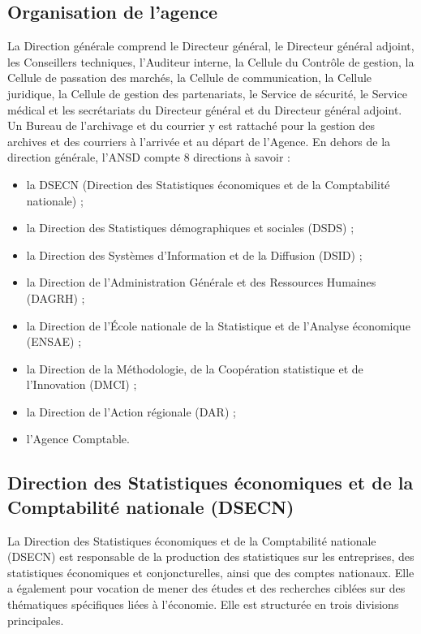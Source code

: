 \documentclass[12pt,a4paper]{report}
\begin{document}
\subsection{Organisation de l'agence}
La Direction générale comprend le Directeur général, le Directeur général adjoint, les Conseillers techniques, l'Auditeur interne, la Cellule du Contrôle de gestion, la Cellule de passation des marchés, la Cellule de communication, la Cellule juridique, la Cellule de gestion des partenariats, le Service de sécurité, le Service médical et les secrétariats du Directeur général et du Directeur général adjoint. Un Bureau de l'archivage et du courrier y est rattaché pour la gestion des archives et des courriers à l'arrivée et au départ de l'Agence. En dehors de la direction générale, l'ANSD compte 8 directions à savoir :
\begin{itemize}[nosep]
\item la DSECN (Direction des Statistiques économiques et de la Comptabilité nationale) ;
\item la Direction des Statistiques démographiques et sociales (DSDS) ;
\item la Direction des Systèmes d'Information et de la Diffusion (DSID) ;
\item la Direction de l'Administration Générale et des Ressources Humaines (DAGRH) ;
\item la Direction de l’École nationale de la Statistique et de l’Analyse économique (ENSAE) ;
\item la Direction de la Méthodologie, de la Coopération statistique et de l'Innovation (DMCI) ;
\item la Direction de l’Action régionale (DAR) ;
\item l'Agence Comptable.
\end{itemize}

\subsection{Direction des Statistiques économiques et de la Comptabilité nationale (DSECN)}

La Direction des Statistiques économiques et de la Comptabilité nationale (DSECN) est responsable de la production des statistiques sur les entreprises, des statistiques économiques et conjoncturelles, ainsi que des comptes nationaux. Elle a également pour vocation de mener des études et des recherches ciblées sur des thématiques spécifiques liées à l'économie. Elle est structurée en trois divisions principales.
\end{document}
